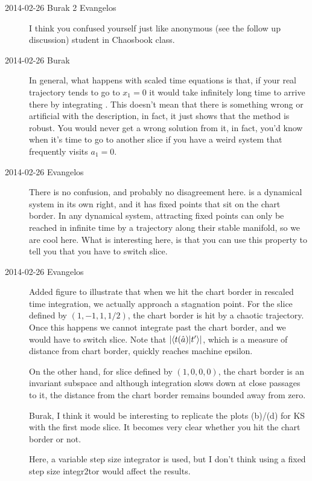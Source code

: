 \begin{description}
\item[2014-02-26 Burak 2 Evangelos] I think you confused yourself just like
anonymous (see the follow up discussion) student in Chaosbook class.

\item[2014-02-26 Burak] In general, what happens with scaled time equations
is that, if your real trajectory tends to go to $x_1 = 0$ it would take infinitely
long time to arrive there by integrating . This doesn't
mean that there is something wrong or artificial with the description, in fact,
it just shows that the method is robust. You would never get a wrong solution
from it, in fact, you'd know when it's time to go to another slice if you
have a weird system that frequently visits $a_1 = 0$.

\item[2014-02-26 Evangelos] There is no confusion, and probably no disagreement here.
 is a dynamical system in its own right, and it has fixed points
that sit on the chart border. In any dynamical system, attracting fixed points can only
be reached in infinite time by a trajectory along their stable manifold,
so we are cool here. What is interesting here, is that you can use this property to tell
you that you have to switch slice.

\item[2014-02-26 Evangelos] Added figure to illustrate that when we hit the chart border
in rescaled time integration, we actually approach a stagnation point. For the slice defined by
$(1,-1,1, 1/2)$, the chart border is hit by a chaotic trajectory. Once this happens we cannot integrate
past the chart border, and we would have to switch slice. Note that $|\braket{\groupTan(\sspRed)}{\sliceTan{}}|$,
which is a measure of distance from chart border, quickly reaches machine epsilon.

On the other hand, for slice defined by $(1,0,0,0)$, the chart border is an invariant subspace
and although integration slows down at close passages to it, the distance from the chart border
remains bounded away from zero.

Burak, I think it would be interesting to replicate the plots (b)/(d) for KS with the first mode slice.
It becomes very clear whether you hit the chart border or not.

Here, a variable step size integrator is used, but I don't think using a fixed step size integr2tor would
affect the results.


\end{description}
